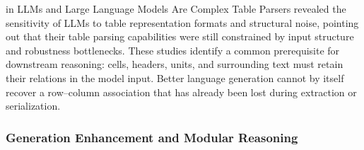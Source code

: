 in LLMs \cite{singha2023tabular} and Large Language Models Are Complex Table Parsers \cite{zhao2023large} revealed the sensitivity of LLMs to table representation formats and structural noise, pointing out that their table parsing capabilities were still constrained by input structure and robustness bottlenecks.  These studies identify a common prerequisite for downstream reasoning: cells, headers, units, and surrounding text must retain their relations in the model input. Better language generation cannot by itself recover a row--column association that has already been lost during extraction or serialization.

\subsubsection{Generation Enhancement and Modular Reasoning}
